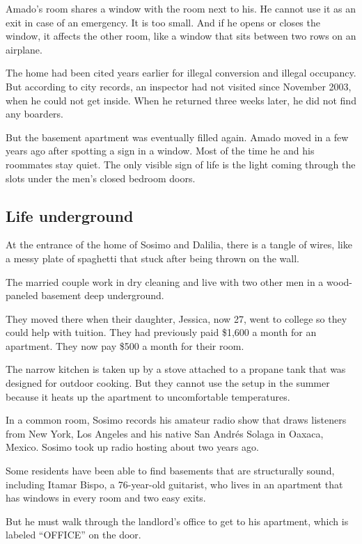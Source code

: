 Amado's room shares a window with the room next to his. He cannot use it
as an exit in case of an emergency. It is too small. And if he opens or
closes the window, it affects the other room, like a window that sits
between two rows on an airplane.

The home had been cited years earlier for illegal conversion and illegal
occupancy. But according to city records, an inspector had not visited
since November 2003, when he could not get inside. When he returned
three weeks later, he did not find any boarders.

But the basement apartment was eventually filled again. Amado moved in a
few years ago after spotting a sign in a window. Most of the time he and
his roommates stay quiet. The only visible sign of life is the light
coming through the slots under the men's closed bedroom doors.

\hypertarget{life-underground}{%
\subsection{Life underground}\label{life-underground}}

At the entrance of the home of Sosimo and Dalilia, there is a tangle of
wires, like a messy plate of spaghetti that stuck after being thrown on
the wall.

The married couple work in dry cleaning and live with two other men in a
wood-paneled basement deep underground.

They moved there when their daughter, Jessica, now 27, went to college
so they could help with tuition. They had previously paid \$1,600 a
month for an apartment. They now pay \$500 a month for their room.

The narrow kitchen is taken up by a stove attached to a propane tank
that was designed for outdoor cooking. But they cannot use the setup in
the summer because it heats up the apartment to uncomfortable
temperatures.

In a common room, Sosimo records his amateur radio show that draws
listeners from New York, Los Angeles and his native San Andrés Solaga in
Oaxaca, Mexico. Sosimo took up radio hosting about two years ago.

Some residents have been able to find basements that are structurally
sound, including Itamar Bispo, a 76-year-old guitarist, who lives in an
apartment that has windows in every room and two easy exits.

But he must walk through the landlord's office to get to his apartment,
which is labeled ``OFFICE'' on the door.

